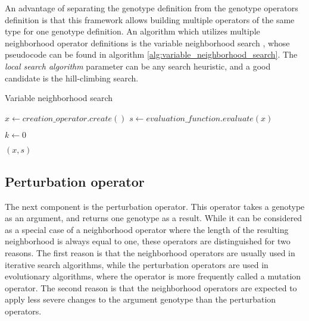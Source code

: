 An advantage of separating the genotype definition from the genotype operators definition is that this framework allows building multiple operators of the same type for one genotype definition. An algorithm which utilizes multiple neighborhood operator definitions is the variable neighborhood search \citep{variable_neighborhood_search}, whose pseudocode can be found in algorithm \ref{alg:variable_neighborhood_search}. The \textit{local search algorithm} parameter can be any search heuristic, and a good candidate is the hill-climbing search.

\begin{algorithm}[!htbp]
    \caption{Variable neighborhood search}
    \label{alg:variable_neighborhood_search}

    $x \gets creation\_operator.create()$\;
    $s \gets evaluation\_function.evaluate(x)$\;

     {

        $k \gets 0$\;
    }

    \Return $(x, s)$\;
    \end{algorithm}

\subsection{Perturbation operator}
\label{sec:perturbation_operator}

The next component is the perturbation operator. This operator takes a genotype as an argument, and returns one genotype as a result. While it can be considered as a special case of a neighborhood operator where the length of the resulting neighborhood is always equal to one, these operators are distinguished for two reasons. The first reason is that the neighborhood operators are usually used in iterative search algorithms, while the perturbation operators are used in evolutionary algorithms, where the operator is more frequently called a mutation operator. The second reason is that the neighborhood operators are expected to apply less severe changes to the argument genotype than the perturbation operators. 

